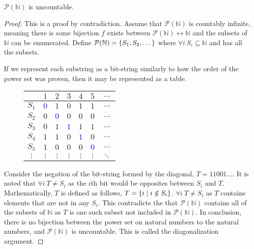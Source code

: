 \begin{proposition}
    \(\mathcal{P}(\mathbb{N})\) is uncountable.
\end{proposition}
\begin{proof}
    This is a proof by contradiction. Assume that \(\mathcal{P}(\mathbb{N})\) is countably infinite, meaning there is some bijection \(f\) exists between 
    \(\mathcal{P}(\mathbb{N})\leftrightarrow\mathbb{N}\) and the subsets of \(\mathbb{N}\) can be enumerated. Define \(\mathcal{P}(\mathbb{N})=\{S_1,S_2,\dots\}\) 
    where \(\forall i\ S_i\subseteq\mathbb{N}\) and has all the subsets.

    If we represent each substring as a bit-string similarly to how the order of the power set was proven, then it may be represented as a table.
    \begin{figure}[H]
        \centering
        \begin{tabular}{c|cccccc}
                    & \(1\) & \(2\) & \(3\) & \(4\) & \(5\) & \(\dots\) \\
            \hline
            \(S_1\) & \textcolor{blue}{\(0\)} & \(1\) & \(0\) & \(1\) & \(1\) & \(\dots\) \\
            \(S_2\) & \(0\) & \textcolor{blue}{\(0\)} & \(0\) & \(0\) & \(0\) & \(\dots\) \\
            \(S_3\) & \(0\) & \(1\) & \textcolor{blue}{\(1\)} & \(1\) & \(1\) & \(\dots\) \\
            \(S_4\) & \(1\) & \(1\) & \(0\) & \textcolor{blue}{\(1\)} & \(0\) & \(\dots\) \\
            \(S_5\) & \(1\) & \(0\) & \(0\) & \(0\) & \textcolor{blue}{\(0\)} & \(\dots\) \\
            \(\vdots\) & \(\vdots\) & \(\vdots\) & \(\vdots\) & \(\vdots\) & \(\vdots\) & \(\ddots\)
        \end{tabular}
    \end{figure}
    Consider the negation of the bit-string formed by the diagonal, \(T=11001\dots\). It is noted that \(\forall i\ T\ne S_i\) as the \(i\)th bit would be opposites between
    \(S_i\) and \(T\). Mathematically, \(T\) is defined as follows, \(T=\{i\mid i\notin S_i\}\). \(\forall i\ T\ne S_i\) as \(T\) contains elements that are not in any
    \(S_i\). This contradicts the that \(\mathcal{P}(\mathbb{N})\) contains all of the subsets of \(\mathbb{N}\) as \(T\) is one such subset not included in \(\mathcal{P}(\mathbb{N})\).
    In conclusion, there is no bijection between the power set on natural numbers to the natural numbers, and \(\mathcal{P}(\mathbb{N})\) is uncountable. This is called the 
    diagonalization argument.
\end{proof}
